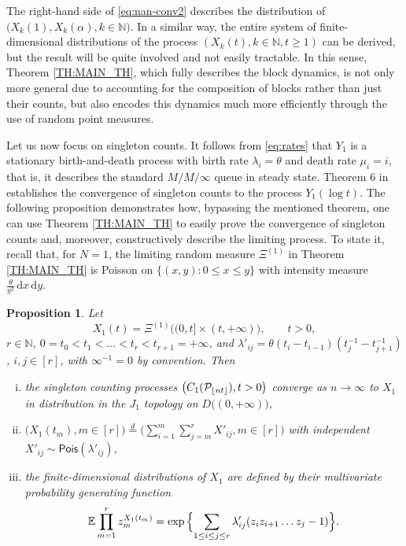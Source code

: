 \documentclass[11pt]{article}
\newcommand{\dd}{\mathrm d}
\newcommand{\N}{\mathbb{N}}
\newcommand{\E}{\mathbb{E}}
\newcommand{\1}[1][]{
	\ifx&#1&\mathds{1}
	\else\mathds{1}\left\{#1\right\}\fi}
\newcommand{\deq}{\overset{d}{=}}
\newcommand{\Pois}[1]{\mathsf{Pois}(#1)}
\newcommand{\Pc}{\mathcal{P}}
\DeclarePairedDelimiter\floor{\lfloor}{\rfloor}
\newtheorem{proposition}{Proposition}[section]
\theoremstyle{definition}
\theoremstyle{remark}
\numberwithin{equation}{section}
\begin{document}
	The right-hand side of \eqref{eq:nan-conv2} describes the distribution of $\bigl(X_k(1), X_k(\alpha), k \in \N\bigr)$.
	In a similar way, the entire system of finite-dimensional distributions of the process $(X_k(t),k\in\N, t\ge 1)$ can be derived,
	but the result will be quite involved and not easily tractable. In this sense, Theorem \ref{TH:MAIN_TH},
	which fully describes the block dynamics, is not only more general due to accounting for the composition of blocks
	rather than just their counts, but also encodes this dynamics much more efficiently through the use of random point measures.
	
	Let us now focus on singleton counts. It follows from \eqref{eq:rates} that $Y_1$ is a stationary
	birth-and-death process with birth rate $\lambda_i=\theta$ and death rate $\mu_i=i$, that is,
	it describes the standard $M/M/\infty$ queue in steady state.
	Theorem 6 in \cite{GS23} establishes the convergence of singleton counts to the process $Y_1(\log t)$.
	The following proposition demonstrates how, bypassing the mentioned theorem, one can use Theorem \ref{TH:MAIN_TH}
	to easily prove the convergence of singleton counts and, moreover, constructively describe the limiting process.
	To state it, recall that, for $N=1$, the limiting random measure $\Xi^{(1)}$ in Theorem \ref{TH:MAIN_TH} is
	Poisson on $\{(x,y): 0\le x\le y\}$ with intensity measure $\frac{\theta}{y^2}\,\dd x\,\dd y$.
	
	\begin{proposition}
		\label{prop:fpc}
		Let
		\begin{equation*}
			X_1(t) = \Xi^{(1)}\bigl((0, t]\times(t,+\infty)\bigr), \qquad t>0,
		\end{equation*}
		$r\in\N$, $0 = t_0 < t_1 < \ldots < t_r < t_{r+1} = +\infty$, 
		and $\lambda'_{ij}=\theta(t_i-t_{i-1})(t_j^{-1}-t_{j+1}^{-1})$, $i,j\in[r]$, with $\infty^{-1}=0$ by convention. Then
		\begin{enumerate}[(i)]
			\item the singleton counting processes $\bigl(C_1(\Pc_{\floor{nt}}), t>0\bigr)$ converge as
			$n\to\infty$ to $X_1$ in distribution in the $J_1$ topology on $D\bigl((0, +\infty)\bigr)$,
			\item $\bigl(X_1(t_m),m\in[r]\bigr) \deq \bigl(\sum_{i=1}^m\sum_{j=m}^r X'_{ij}, m\in[r]\bigr)$ with independent
			$X'_{ij}\sim\Pois{\lambda'_{ij}}$,
			\item the finite-dimensional distributions of $X_1$ are defined by their multivariate probability generating function
			\begin{equation*}
				\E\prod_{m=1}^r z_m^{X_1(t_m)} = \exp{\Bigl\{\sum_{1\le i \le j \le r} \lambda'_{ij}(z_iz_{i+1}\ldots z_j-1)\Bigr\}}.
			\end{equation*}
		\end{enumerate}            
	\end{proposition}
	
\end{document}

